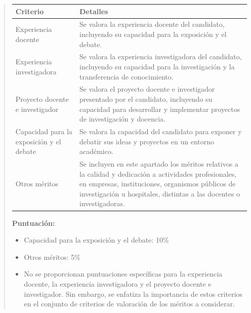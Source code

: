 \documentclass[12pt,a4paper,oneside]{report}
\begin{document}
\begin{itemize}
\begin{itemize}
\begin{quote}
\begin{tabular}{p{3.5cm} p{8cm}}
\toprule
\textbf{Criterio} & \textbf{Detalles} \\
\midrule
Experiencia docente & Se valora la experiencia docente del candidato, incluyendo su capacidad para la exposición y el debate. \\
Experiencia investigadora & Se valora la experiencia investigadora del candidato, incluyendo su capacidad para la investigación y la transferencia de conocimiento. \\
Proyecto docente e investigador & Se valora el proyecto docente e investigador presentado por el candidato, incluyendo su capacidad para desarrollar y implementar proyectos de investigación y docencia. \\
Capacidad para la exposición y el debate & Se valora la capacidad del candidato para exponer y debatir sus ideas y proyectos en un entorno académico. \\
Otros méritos & Se incluyen en este apartado los méritos relativos a la calidad y dedicación a actividades profesionales, en empresas, instituciones, organismos públicos de investigación u hospitales, distintas a las docentes o investigadoras. \\
\bottomrule
\end{tabular}


\textbf{Puntuación:}
\begin{itemize}
  \item Capacidad para la exposición y el debate: 10\%
  \item Otros méritos: 5\%
  \item No se proporcionan puntuaciones específicas para la experiencia docente, la experiencia investigadora y el proyecto docente e investigador. Sin embargo, se enfatiza la importancia de estos criterios en el conjunto de criterios de valoración de los méritos a considerar.
\end{itemize}


\end{quote}
\end{itemize}
\end{itemize}
\end{document}

